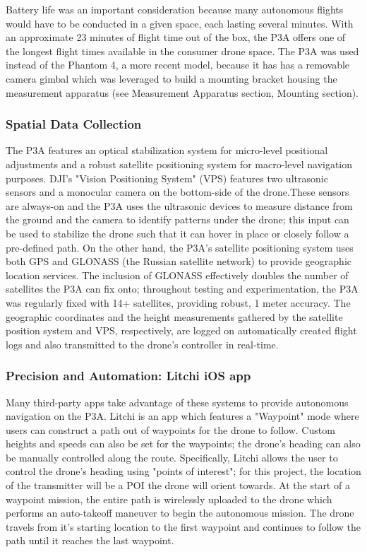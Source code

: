 \documentclass[pageno]{jpaper}
\begin{document}
Battery life was an important consideration because many autonomous flights would have to be conducted in a given space, each lasting several minutes. With an approximate 23 minutes of flight time out of the box, the P3A offers one of the longest flight times available in the consumer drone space. The P3A was used instead of the Phantom 4, a more recent model, because it has has a removable camera gimbal which was leveraged to build a mounting bracket housing the measurement apparatus (see Measurement Apparatus section, Mounting section). 

\subsubsection{Spatial Data Collection}
The P3A features an optical stabilization system for micro-level positional adjustments and a robust satellite positioning system for macro-level navigation purposes. DJI's "Vision Positioning System" (VPS) features two ultrasonic sensors and a monocular camera on the bottom-side of the drone.These sensors are always-on and the P3A uses the ultrasonic devices to measure distance from the ground and the camera to identify patterns under the drone; this input can be used to stabilize the drone such that it can hover in place or closely follow a pre-defined path. On the other hand, the P3A's satellite positioning system uses both GPS and GLONASS (the Russian satellite network) to provide geographic location services. The inclusion of GLONASS effectively doubles the number of satellites the P3A can fix onto; throughout testing and experimentation, the P3A was regularly fixed with 14+ satellites, providing robust, 1 meter accuracy. The geographic coordinates and the height measurements gathered by the satellite position system and VPS, respectively, are logged on automatically created flight logs and also transmitted to the drone's controller in real-time.

\subsubsection{Precision and Automation: Litchi iOS app}
Many third-party apps take advantage of these systems to provide autonomous navigation on the P3A. Litchi is an app which features a "Waypoint" mode where users can construct a path out of waypoints for the drone to follow. Custom heights and speeds can also be set for the waypoints; the drone's heading can also be manually controlled along the route. Specifically, Litchi allows the user to control the drone's heading using "points of interest"; for this project, the location of the transmitter will be a POI the drone will orient towards. At the start of a waypoint mission, the entire path is wirelessly uploaded to the drone which performs an auto-takeoff maneuver to begin the autonomous mission. The drone travels from it's starting location to the first waypoint and continues to follow the path until it reaches the last waypoint. 
\end{document}
